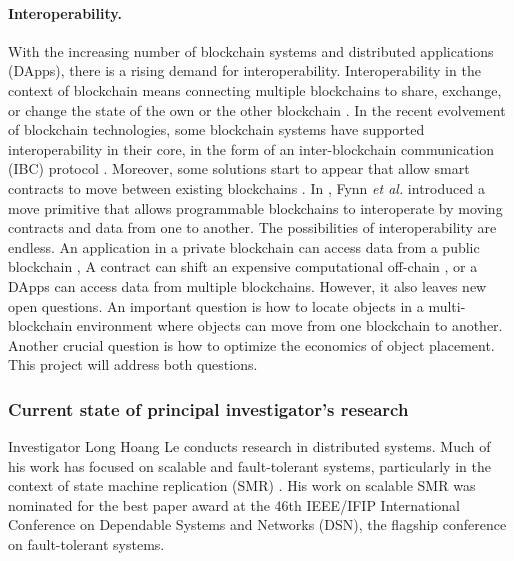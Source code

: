 \paragraph*{Interoperability.} With the increasing number of blockchain systems
and distributed applications (DApps), there is a rising demand for
interoperability. Interoperability in the context of blockchain means connecting
multiple blockchains to share, exchange, or change the state of the own or the
other blockchain \cite{buterin2016chain}. In the recent evolvement of blockchain
technologies, some blockchain systems have supported interoperability in their
core, in the form of an inter-blockchain communication (IBC) protocol
\cite{kwon2016cosmos, thomas2015protocol, kokoris2018omniledger,
al2017chainspace}. Moreover, some solutions start to appear that allow smart
contracts to move between existing blockchains \cite{fynn2020move,
back2014enabling, herlihy2018atomic}. In \cite{fynn2020move}, Fynn \emph{et al.}
introduced a move primitive \cite{fynn2020move} that allows programmable blockchains
to interoperate by moving contracts and data from one to another. The
possibilities of interoperability are endless. An application in a private
blockchain can access data from a public blockchain \cite{prusty2018blockchain},
A contract can shift an expensive computational off-chain
\cite{teutsch2019scalable, network2018cheap}, or a DApps can access data from
multiple blockchains. However, it also leaves new open questions. An important question is
how to locate objects in a multi-blockchain environment where objects can move from one
blockchain to another.
Another crucial question is how to optimize the economics of object placement.
This project will address both questions.

\subsubsection{Current state of principal investigator's research}

Investigator Long Hoang Le conducts research in distributed systems. Much of his
work has focused on scalable and fault-tolerant systems, particularly in the context of
state machine replication (SMR) \cite{le2016dssmr, le2019dynastar, bezerra2016strong}.
His work on scalable SMR \cite{le2016dssmr} was nominated for the best paper award at 
the 46th IEEE/IFIP International Conference on Dependable Systems and Networks (DSN),
the flagship conference on fault-tolerant systems.


